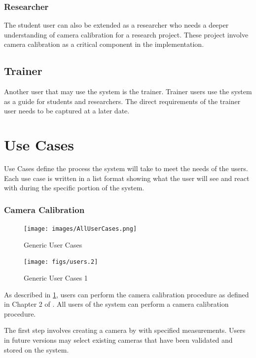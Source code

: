 \documentclass[11pt]{report}
\begin{document}
\subsubsection{Researcher}

The student user can also be extended as a researcher who needs a deeper understanding of camera calibration for a research project. These project involve camera calibration as a critical component in the implementation. 

\subsection{Trainer}

Another user that may use the system is the trainer. Trainer users use the system as a guide for students and researchers. The direct requirements of the trainer user needs to be captured at a later date.

\section{Use Cases}

Use Cases define the process the system will take to meet the needs of the users. Each use case is written in a list format showing what the user will see and react with during the specific portion of the system. 
\subsubsection{Camera Calibration}

\begin{figure}[htp]
\centering
\texttt{[image: images/AllUserCases.png]}
\caption{Generic User Cases}
\label{fig:guc}
\end{figure}

\begin{figure}[htp]
\centering
\texttt{[image: figs/users.2]}
\caption{Generic User Cases 1}
\label{fig:guc1}
\end{figure}


As described in \ref{fig:guc}, users can perform the camera calibration procedure as defined in Chapter 2 of \cite{CC}. All users of the system can perform a camera calibration procedure. 

The first step involves creating a camera by with specified measurements. Users in future versions may select existing cameras that have been validated and stored on the system. 
\end{document}
